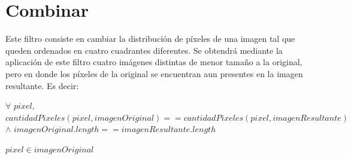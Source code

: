 \section{Combinar}
Este filtro consiste en cambiar la distribución de píxeles de una imagen tal que queden ordenados en cuatro cuadrantes diferentes. Se obtendrá mediante la aplicación de este filtro cuatro imágenes distintas de menor tamaño a la original, pero en donde los píxeles de la original se encuentran aun presentes en la imagen resultante. Es decir: 
\begin{center}
	$\forall$ $pixel,$ $cantidadPixeles(pixel, imagenOriginal) == cantidadPixeles(pixel,imagenResultante)$
	$\wedge$ $imagenOriginal.length == imagenResultante.length$
\end{center}
\begin{flushright}
	$pixel \in imagenOriginal$
\end{flushright}

